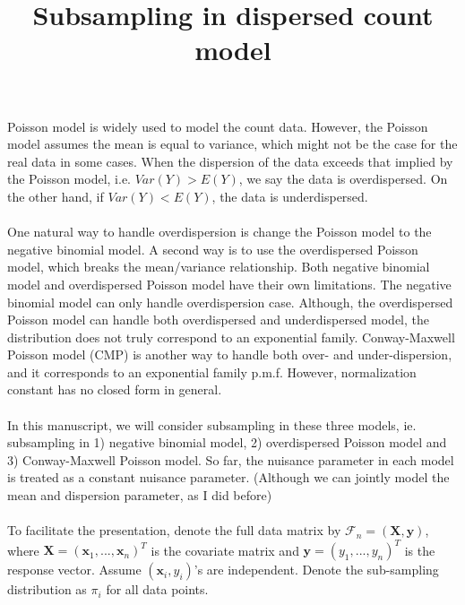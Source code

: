 \documentclass[]{article}
\title{Subsampling in dispersed count model}
\begin{document}
\maketitle
Poisson model is widely used to model the count data. However, the Poisson model assumes the mean is equal to variance, which might not be the case for the real data in some cases. When the dispersion of the data exceeds that implied by the Poisson model, i.e. $Var(Y) > E(Y)$, we say the data is overdispersed. On the other hand, if $Var(Y) < E(Y)$, the data is underdispersed.\\
\\
One natural way to handle overdispersion is change the Poisson model to the negative binomial model. A second way is to use the overdispersed Poisson model, which breaks the mean/variance relationship. Both negative binomial model and overdispersed Poisson model have their own limitations. The negative binomial model can only handle overdispersion case. Although, the overdispersed Poisson model can handle both overdispersed and underdispersed model, the distribution does not truly correspond to an exponential family. Conway-Maxwell Poisson model (CMP) is another way to handle both over- and under-dispersion, and it corresponds to an exponential family p.m.f. However, normalization constant has no closed form in general.\\ 
\\
In this manuscript, we will consider subsampling in these three models, ie. subsampling in 1) negative binomial model, 2) overdispersed Poisson model and 3) Conway-Maxwell Poisson model. So far, the nuisance parameter in each model is treated as a constant nuisance parameter. (Although we can jointly model the mean and dispersion parameter, as I did before)\\
\\
To facilitate the presentation, denote the full data matrix by $\mathcal{F}_n = (\boldsymbol{X}, \boldsymbol{y})$, where $\boldsymbol{X} = (\boldsymbol{x}_1, ..., \boldsymbol{x}_n)^{T}$ is the covariate matrix and $\boldsymbol{y} = (y_1, ..., y_n)^{T}$ is the response vector. Assume $(\boldsymbol{x}_i, y_i)$'s are independent. Denote the sub-sampling distribution as $\pi_i$ for all data points.
\end{document}
